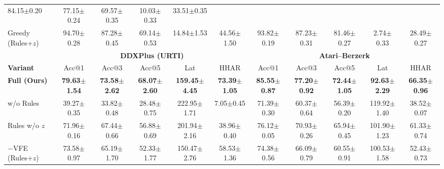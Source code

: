 \documentclass{article} %
\newcommand{\revise}[1]{#1}
\begin{document}
\begin{table}[!t]
{\begin{tabular}{lccccc|ccccc}
84.15\revise{${\pm}$\tiny{0.20}} & 77.15\revise{${\pm}$\tiny{0.24}} & 69.57\revise{${\pm}$\tiny{0.35}} & 10.03\revise{${\pm}$\tiny{0.33}} & 33.51\revise{${\pm}$\tiny{0.35}} \\
Greedy (Rules+$z$) & 94.70\revise{${\pm}$\tiny{0.28}} & 87.28\revise{${\pm}$\tiny{0.45}} & 69.14\revise{${\pm}$\tiny{0.53}} & 14.84\revise{${\pm}$\tiny{1.53}} & 44.56\revise{${\pm}$\tiny{1.50}} &
93.82\revise{${\pm}$\tiny{0.19}} & 87.23\revise{${\pm}$\tiny{0.31}} & 81.46\revise{${\pm}$\tiny{0.27}} & 2.74\revise{${\pm}$\tiny{0.33}} & 28.49\revise{${\pm}$\tiny{0.27}} \\
\midrule
& \multicolumn{5}{c}{\textbf{DDXPlus (URTI)}} & \multicolumn{5}{c}{\textbf{Atari--Berzerk}} \\
\cmidrule(lr){2-6}\cmidrule(lr){7-11}
\textbf{Variant} & Acc@1 & Acc@3 & Acc@5 & Lat & HHAR & Acc@1 & Acc@3 & Acc@5 & Lat & HHAR \\
\midrule
\textbf{Full (Ours)} & \textbf{79.63\revise{${\pm}$\tiny{1.54}}} & \textbf{73.58\revise{${\pm}$\tiny{2.62}}} & \textbf{68.07\revise{${\pm}$\tiny{2.60}}} & \textbf{159.45\revise{${\pm}$\tiny{4.45}}} & \textbf{73.39\revise{${\pm}$\tiny{1.05}}} &
\textbf{85.55\revise{${\pm}$\tiny{0.87}}} & \textbf{77.20\revise{${\pm}$\tiny{0.92}}} & \textbf{72.44\revise{${\pm}$\tiny{1.05}}} & \textbf{92.63\revise{${\pm}$\tiny{2.29}}} & \textbf{66.35\revise{${\pm}$\tiny{0.96}}} \\
w/o Rules & 39.27\revise{${\pm}$\tiny{0.35}} & 33.82\revise{${\pm}$\tiny{0.48}} & 28.48\revise{${\pm}$\tiny{0.75}} & 222.95\revise{${\pm}$\tiny{1.71}} & 7.05\revise{${\pm}$\tiny{0.45}} &
71.39\revise{${\pm}$\tiny{0.30}} & 60.37\revise{${\pm}$\tiny{0.64}} & 56.39\revise{${\pm}$\tiny{0.20}} & 119.92\revise{${\pm}$\tiny{1.40}} & 38.52\revise{${\pm}$\tiny{0.07}} \\
Rules w/o $z$ & 71.96\revise{${\pm}$\tiny{0.16}} & 67.44\revise{${\pm}$\tiny{0.66}} & 56.88\revise{${\pm}$\tiny{0.69}} & 201.94\revise{${\pm}$\tiny{2.16}} & 38.96\revise{${\pm}$\tiny{0.40}} &
76.12\revise{${\pm}$\tiny{0.05}} & 70.93\revise{${\pm}$\tiny{0.26}} & 65.94\revise{${\pm}$\tiny{0.45}} & 101.90\revise{${\pm}$\tiny{1.23}} & 61.33\revise{${\pm}$\tiny{0.74}} \\
$-$VFE (Rules+$z$) & 73.58\revise{${\pm}$\tiny{0.97}} & 65.19\revise{${\pm}$\tiny{1.70}} & 52.33\revise{${\pm}$\tiny{1.77}} & 150.47\revise{${\pm}$\tiny{2.76}} & 58.53\revise{${\pm}$\tiny{1.36}} &
74.38\revise{${\pm}$\tiny{0.56}} & 66.09\revise{${\pm}$\tiny{0.79}} & 60.55\revise{${\pm}$\tiny{0.91}} & 100.53\revise{${\pm}$\tiny{1.58}} & 52.43\revise{${\pm}$\tiny{0.73}} \\

\end{tabular}}
\end{table}
\end{document}
